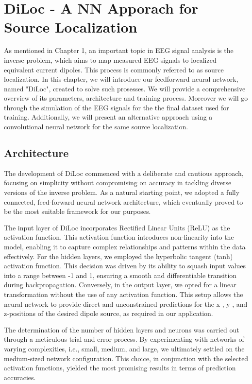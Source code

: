 \documentclass[a4paper, UKenglish, 11pt]{uiomaster}
\begin{document}
\chapter{DiLoc - A NN Apporach for Source Localization}
As mentioned in Chapter 1, an important topic in EEG signal analysis is the inverse problem, which aims to map measured EEG signals to localized equivalent current dipoles. This process is commonly referred to as source localization. In this chapter, we will introduce our feedforward neural network, named "DiLoc", created to solve such prosesses. We will provide a comprehensive overview of its parameters, architecture and training process. Moreover we will go through the simulation of the EEG signals for the the final dataset used for training. Additionally, we will present an alternative approach using a convolutional neural network for the same source localization.

\section{Architecture}
The development of DiLoc commenced with a deliberate and cautious approach, focusing on simplicity without compromising on accuracy in tackling diverse versions of the inverse problem. As a natural starting point, we adopted a fully connected, feed-forward neural network architecture, which eventually proved to be the most suitable framework for our purposes.

The input layer of DiLoc incorporates Rectified Linear Units (ReLU) as the activation function. This activation function introduces non-linearity into the model, enabling it to capture complex relationships and patterns within the data effectively. For the hidden layers, we employed the hyperbolic tangent (tanh) activation function. This decision was driven by its ability to squash input values into a range between -1 and 1, ensuring a smooth and differentiable transition during backpropagation. Conversely, in the output layer, we opted for a linear transformation without the use of any activation function. This setup allows the neural network to provide direct and unconstrained predictions for the x-, y-, and z-positions of the desired dipole source, as required in our application.

The determination of the number of hidden layers and neurons was carried out through a meticulous trial-and-error process. By experimenting with networks of varying complexities, i.e., small, medium, and large, we ultimately settled on the medium-sized network configuration. This choice, in conjunction with the selected activation functions, yielded the most promising results in terms of prediction accuracies.
\end{document}
